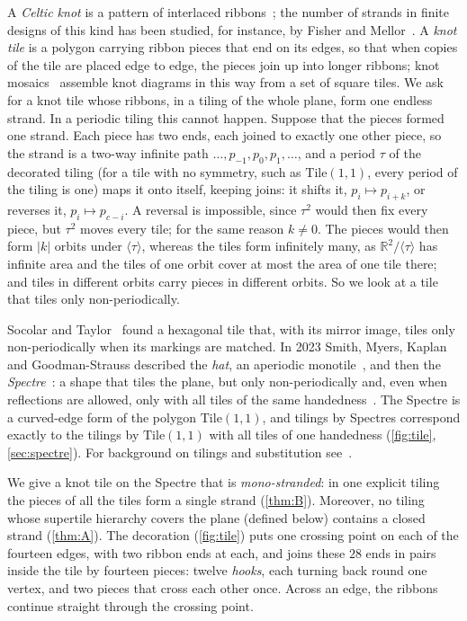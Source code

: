 \documentclass[11pt]{amsart}
\theoremstyle{definition}
\theoremstyle{remark}
\newcommand{\Tile}{\mathrm{Tile}(1,1)}
\newcommand{\RR}{\mathbb R}
\begin{document}
A \emph{Celtic knot} is a pattern of interlaced ribbons~\cite{Bain,Cromwell1993}; the number of strands in finite
designs of this kind has been studied, for instance, by Fisher and Mellor~\cite{FisherMellor}. A \emph{knot tile} is a
polygon carrying ribbon pieces that end on its edges, so that when copies of the tile are placed edge to edge, the
pieces join up into longer ribbons; knot mosaics~\cite{LomonacoKauffman} assemble knot diagrams in this way from a set
of square tiles. We ask for a knot tile whose ribbons, in a tiling of the whole plane, form one endless strand. In a
periodic tiling this cannot happen. Suppose that the pieces formed one strand. Each piece has two ends, each joined to
exactly one other piece, so the strand is a two-way infinite path $\dots,p_{-1},p_0,p_1,\dots$, and a period $\tau$ of
the decorated tiling (for a tile with no symmetry, such as $\Tile$, every period of the tiling is one) maps it onto
itself, keeping joins: it shifts it, $p_i\mapsto p_{i+k}$, or reverses it, $p_i\mapsto p_{c-i}$. A reversal is
impossible, since $\tau^2$ would then fix every piece, but $\tau^2$ moves every tile; for the same reason $k\neq0$. The
pieces would then form $|k|$ orbits under $\langle\tau\rangle$, whereas the tiles form infinitely many, as
$\RR^2/\langle\tau\rangle$ has infinite area and the tiles of one orbit cover at most the area of one tile there; and
tiles in different orbits carry pieces in different orbits.
So we look at a tile that tiles only non-periodically.

Socolar and Taylor~\cite{SocolarTaylor} found a hexagonal tile that, with its mirror image, tiles only
non-periodically when its markings are matched. In 2023 Smith, Myers, Kaplan and Goodman-Strauss described the
\emph{hat}, an aperiodic monotile~\cite{SMKGS-hat}, and then the \emph{Spectre}~\cite{SMKGS-spectre}: a shape that
tiles the plane, but only non-periodically and, even when reflections are allowed, only with all tiles of the same
handedness~\cite[Thm.~2.2]{SMKGS-spectre}. The Spectre is a curved-edge form of the polygon $\Tile$, and tilings by
Spectres correspond exactly to the tilings by $\Tile$ with all tiles of one handedness (\cref{fig:tile},
\cref{sec:spectre}). For background on tilings and substitution see~\cite{GrunbaumShephard,BaakeGrimm}.

We give a knot tile on the Spectre that is \emph{mono-stranded}: in one explicit tiling the pieces of all the tiles
form a single strand (\cref{thm:B}). Moreover, no tiling whose supertile hierarchy covers the plane (defined below)
contains a closed strand (\cref{thm:A}). The decoration (\cref{fig:tile}) puts one crossing point on each of the
fourteen edges, with two ribbon ends at each, and joins these $28$ ends in pairs inside the tile by fourteen pieces:
twelve \emph{hooks}, each turning back round one vertex, and two pieces that cross each other once. Across an edge,
the ribbons continue straight through the crossing point.
\end{document}
